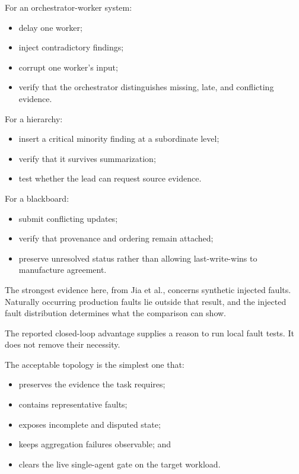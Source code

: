 
For an orchestrator-worker system:

\begin{itemize}
\tightlist
\item
  delay one worker;
\item
  inject contradictory findings;
\item
  corrupt one worker's input;
\item
  verify that the orchestrator distinguishes missing, late, and conflicting evidence.
\end{itemize}


For a hierarchy:

\begin{itemize}
\tightlist
\item
  insert a critical minority finding at a subordinate level;
\item
  verify that it survives summarization;
\item
  test whether the lead can request source evidence.
\end{itemize}


For a blackboard:

\begin{itemize}
\tightlist
\item
  submit conflicting updates;
\item
  verify that provenance and ordering remain attached;
\item
  preserve unresolved status rather than allowing last-write-wins to manufacture agreement.
\end{itemize}

The strongest evidence here, from Jia et al., concerns synthetic injected faults. Naturally occurring production faults lie outside that result, and the injected fault distribution determines what the comparison can show.

The reported closed-loop advantage supplies a reason to run local fault tests. It does not remove their necessity.


The acceptable topology is the simplest one that:

\begin{itemize}
\tightlist
\item
  preserves the evidence the task requires;
\item
  contains representative faults;
\item
  exposes incomplete and disputed state;
\item
  keeps aggregation failures observable; and
\item
  clears the live single-agent gate on the target workload.
\end{itemize}

